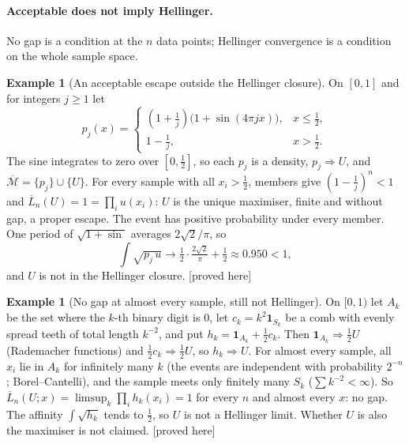 \documentclass[11pt]{article}
\newcommand{\bM}{\overline{\mathcal M}}
\newcommand{\bL}{\overline L}
\newcommand{\status}[1]{\textsf{[#1]}}
\theoremstyle{definition}
\newtheorem{example}[theorem]{Example}
\theoremstyle{remark}
\begin{document}
\paragraph{Acceptable does not imply Hellinger.} No gap is a condition at
the $n$ data points; Hellinger convergence is a condition on the whole
sample space.

\begin{example}[An acceptable escape outside the Hellinger closure]
\label{ex:half-sine}
On $[0,1]$ and for integers $j\ge1$ let
\[
 p_j(x)=\begin{cases}
 (1+\frac1j)\bigl(1+\sin(4\pi jx)\bigr), & x\le\frac12,\\
 1-\frac1j, & x>\frac12.
 \end{cases}
\]
The sine integrates to zero over $[0,\frac12]$, so each $p_j$ is a density,
$p_j\Rightarrow U$, and $\bM=\{p_j\}\cup\{U\}$. For every sample with all
$x_i>\frac12$, members give $(1-\frac1j)^n<1$ and $\bL_n(U)=1=\prod_iu(x_i)$:
$U$ is the unique maximiser, finite and without gap, a proper escape. The
event has positive probability under every member. One period of
$\sqrt{1+\sin}$ averages $2\sqrt2/\pi$, so
\[
 \int\sqrt{p_j\,u}\to\tfrac12\cdot\tfrac{2\sqrt2}{\pi}+\tfrac12\approx0.950<1,
\]
and $U$ is not in the Hellinger closure. \status{proved here}
\end{example}

\begin{example}[No gap at almost every sample, still not Hellinger]
\label{ex:rademacher-comb}
On $[0,1)$ let $A_k$ be the set where the $k$-th binary digit is $0$, let
$c_k=k^2\mathbf 1_{S_k}$ be a comb with evenly spread teeth of total length
$k^{-2}$, and put $h_k=\mathbf 1_{A_k}+\frac12c_k$. Then
$\mathbf 1_{A_k}\Rightarrow\frac12U$ (Rademacher functions) and
$\frac12c_k\Rightarrow\frac12U$, so $h_k\Rightarrow U$. For almost every
sample, all $x_i$ lie in $A_k$ for infinitely many $k$ (the events are
independent with probability $2^{-n}$; Borel--Cantelli), and the sample
meets only finitely many $S_k$ ($\sum k^{-2}<\infty$). So
$\bL_n(U;x)=\limsup_k\prod_ih_k(x_i)=1$ for every $n$ and almost every $x$:
no gap. The affinity $\int\sqrt{h_k}$ tends to $\frac12$, so $U$ is not a
Hellinger limit. Whether $U$ is also the maximiser is not claimed.
\status{proved here}
\end{example}
\end{document}
